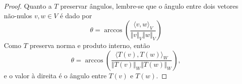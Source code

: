 \begin{proof}
	Quanto a $T$ preservar ângulos, lembre-se que o ângulo entre dois vetores não-nulos $v,w\in V$ é dado por
	\[\theta=\arccos\left(\frac{\langle v,w\rangle_V}{\Vert v\Vert_V\Vert w\Vert_V}\right)\]
	Como $T$ preserva norma e produto interno, então
	\[\theta=\arccos\left(\frac{\langle T(v),T(w)\rangle_W}{\Vert T(v)\Vert_W\Vert T(w)\Vert_W}\right),\]
	e o valor à direita é o ângulo entre $T(v)$ e $T(w)$.
\end{proof}